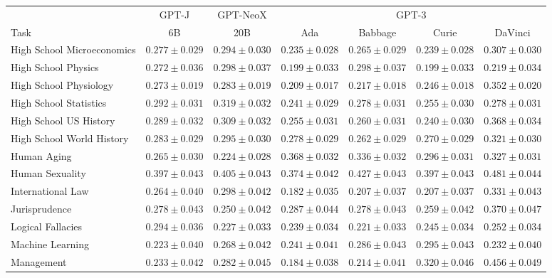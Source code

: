\documentclass[11pt]{article}
\begin{document}
{\begin{landscape}
\begin{table}    
\centering %
\begin{tabular}{l c c c c c c }
 & GPT-J & GPT-NeoX & \multicolumn{4}{c}{GPT-3} \\
Task & 6B & 20B & Ada & Babbage & Curie & DaVinci\\ \toprule
High School Microeconomics & $0.277 \pm 0.029$ & $0.294 \pm 0.030$ & $0.235 \pm 0.028$ & $0.265 \pm 0.029$ & $0.239 \pm 0.028$ & $0.307 \pm 0.030$ \\ 
High School Physics & $0.272 \pm 0.036$ & $0.298 \pm 0.037$ & $0.199 \pm 0.033$ & $0.298 \pm 0.037$ & $0.199 \pm 0.033$ & $0.219 \pm 0.034$ \\ 
High School Physiology & $0.273 \pm 0.019$ & $0.283 \pm 0.019$ & $0.209 \pm 0.017$ & $0.217 \pm 0.018$ & $0.246 \pm 0.018$ & $0.352 \pm 0.020$ \\ 
High School Statistics & $0.292 \pm 0.031$ & $0.319 \pm 0.032$ & $0.241 \pm 0.029$ & $0.278 \pm 0.031$ & $0.255 \pm 0.030$ & $0.278 \pm 0.031$ \\ 
High School US History & $0.289 \pm 0.032$ & $0.309 \pm 0.032$ & $0.255 \pm 0.031$ & $0.260 \pm 0.031$ & $0.240 \pm 0.030$ & $0.368 \pm 0.034$ \\ 
High School World History & $0.283 \pm 0.029$ & $0.295 \pm 0.030$ & $0.278 \pm 0.029$ & $0.262 \pm 0.029$ & $0.270 \pm 0.029$ & $0.321 \pm 0.030$ \\ 
Human Aging & $0.265 \pm 0.030$ & $0.224 \pm 0.028$ & $0.368 \pm 0.032$ & $0.336 \pm 0.032$ & $0.296 \pm 0.031$ & $0.327 \pm 0.031$ \\ 
Human Sexuality & $0.397 \pm 0.043$ & $0.405 \pm 0.043$ & $0.374 \pm 0.042$ & $0.427 \pm 0.043$ & $0.397 \pm 0.043$ & $0.481 \pm 0.044$ \\ 
International Law & $0.264 \pm 0.040$ & $0.298 \pm 0.042$ & $0.182 \pm 0.035$ & $0.207 \pm 0.037$ & $0.207 \pm 0.037$ & $0.331 \pm 0.043$ \\ 
Jurisprudence & $0.278 \pm 0.043$ & $0.250 \pm 0.042$ & $0.287 \pm 0.044$ & $0.278 \pm 0.043$ & $0.259 \pm 0.042$ & $0.370 \pm 0.047$ \\ 
Logical Fallacies & $0.294 \pm 0.036$ & $0.227 \pm 0.033$ & $0.239 \pm 0.034$ & $0.221 \pm 0.033$ & $0.245 \pm 0.034$ & $0.252 \pm 0.034$ \\ 
Machine Learning & $0.223 \pm 0.040$ & $0.268 \pm 0.042$ & $0.241 \pm 0.041$ & $0.286 \pm 0.043$ & $0.295 \pm 0.043$ & $0.232 \pm 0.040$ \\ 
Management & $0.233 \pm 0.042$ & $0.282 \pm 0.045$ & $0.184 \pm 0.038$ & $0.214 \pm 0.041$ & $0.320 \pm 0.046$ & $0.456 \pm 0.049$ \\ 

\end{tabular}
\end{table}
\end{landscape}}
\end{document}
